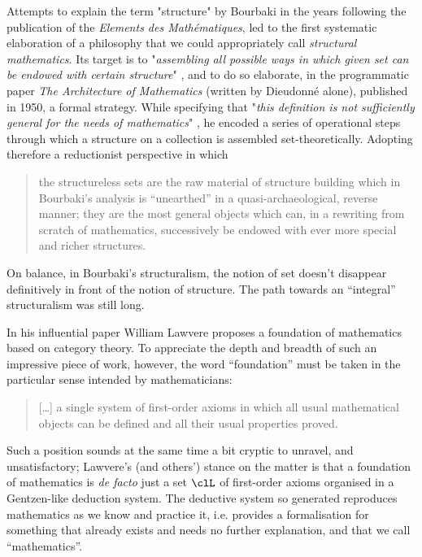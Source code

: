 Attempts to explain the term "structure" by Bourbaki in the years following the publication of the \textit{Elements des Mathématiques}, led to the first systematic elaboration of a philosophy that we could appropriately call \textit{structural mathematics}. Its target is to "\textit{assembling all possible ways in which given set can be endowed with certain structure}" \cite{kromer2007tool}, and to do so elaborate, in the programmatic paper \textit{The Architecture of Mathematics} (written by Dieudonné alone), published in 1950, a formal strategy. While specifying that "\textit{this definition is not sufficiently general for the needs of mathematics}" \cite{Bourb50}, he encoded a series of operational steps through which a structure on a collection is assembled set-theoretically. Adopting therefore a reductionist perspective in which
\begin{quote}
    the structureless sets are the raw material of structure building which in Bourbaki’s analysis is ``unearthed'' in a quasi-archaeological, reverse manner; they are the most general objects which can, in a rewriting from scratch of mathematics, successively be endowed with ever more special and richer structures.\hfill  \cite{kromer2007tool}
\end{quote}
On balance, in Bourbaki's structuralism, the notion of set doesn't disappear definitively in front of the notion of structure. The path towards an ``integral'' structuralism was still long.

In his influential paper \cite{lajolla} William Lawvere proposes a foundation of mathematics based on category theory. To appreciate the depth and breadth of such an impressive piece of work, however, the word ``foundation'' must be taken in the particular sense intended by mathematicians:
\begin{quote}
    [\dots\unkern] a single system of first-order axioms in which all usual mathematical objects can be defined and all their usual properties proved.
\end{quote}
Such a position sounds at the same time a bit cryptic to unravel, and unsatisfactory; Lawvere's (and others') stance on the matter is that a foundation of mathematics is \emph{de facto} just a set $\clL$ of first-order axioms organised in a Gentzen-like deduction system. The deductive system so generated reproduces mathematics as we know and practice it, i.e. provides a formalisation for something that already exists and needs no further explanation, and that we call ``mathematics''.

